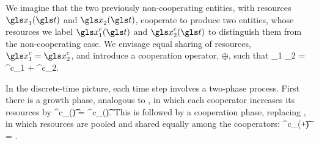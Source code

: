 We imagine that the two previously non-cooperating entities, with resources $\x_1(\t)$ and $\x_2(\t)$, cooperate to produce two entities, whose resources we label $\x^c_1(\t)$ and $\x^c_2(\t)$ to distinguish them from the non-cooperating case. We envisage equal sharing of resources, $\x^c_1=\x^c_2$, and introduce a cooperation operator, $\oplus$, such that
 \be
 \x_1 \oplus \x_2 = \x^c_1 + \x^c_2.
 \ee
 
 In the discrete-time picture, each time step involves a two-phase process. First there is a growth phase, analogous to , in which each cooperator increases its resources by
 \be
 \D \x^c_\gi(\t) = \x^c_\gi(\t)\left[\gmu\D\t + \gsigma\sqrt{\D\t}\,\xi_\gi\right].
 \ee
 This is followed by a cooperation phase, replacing , in which resources are pooled and shared equally among the cooperators:
 \be
 \x^c_\gi(\t+\D\t) = .
 \ee
 
